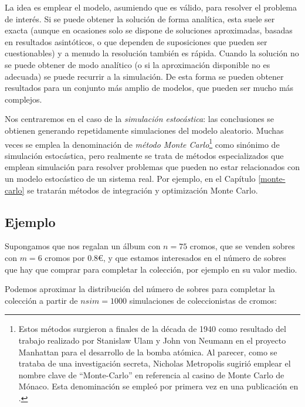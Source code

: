 \documentclass[
  spanish,
  10pt,
]{book}
\theoremstyle{break}
\theoremstyle{nonumberplain}
\let\oldfootnote\footnote
\renewcommand\footnote[1]{\oldfootnote{\hspace{2mm}#1}}
\begin{document}
La idea es emplear el modelo, asumiendo que es válido, para resolver el problema de interés.
Si se puede obtener la solución de forma analítica, esta suele ser exacta (aunque en ocasiones solo se dispone de soluciones aproximadas, basadas en resultados asintóticos, o que dependen de suposiciones que pueden ser cuestionables) y a menudo la resolución también es rápida.
Cuando la solución no se puede obtener de modo analítico (o si la aproximación disponible no es adecuada) se puede recurrir a la simulación.
De esta forma se pueden obtener resultados para un conjunto más amplio de modelos, que pueden ser mucho más complejos.

Nos centraremos en el caso de la \emph{simulación estocástica}: las conclusiones se obtienen generando repetidamente simulaciones del modelo aleatorio.
Muchas veces se emplea la denominación de \emph{método Monte Carlo}\footnote{Estos métodos surgieron a finales de la década de 1940 como resultado del trabajo realizado por Stanislaw Ulam y John von Neumann en el proyecto Manhattan para el desarrollo de la bomba atómica. Al parecer, como se trataba de una investigación secreta, Nicholas Metropolis sugirió emplear el nombre clave de ``Monte-Carlo'' en referencia al casino de Monte Carlo de Mónaco.
  Esta denominación se empleó por primera vez en una publicación en \citet{metropolis1949}.} como sinónimo de simulación estocástica, pero realmente se trata de métodos especializados que emplean simulación para resolver problemas que pueden no estar relacionados con un modelo estocástico de un sistema real. Por ejemplo, en el Capítulo \ref{monte-carlo} se tratarán métodos de integración y optimización Monte Carlo.

\subsection{Ejemplo}\label{ealbum}

Supongamos que nos regalan un álbum con \(n = 75\) cromos, que se venden sobres con \(m = 6\) cromos por 0.8€, y que estamos interesados en el número de sobres que hay que comprar para completar la colección, por ejemplo en su valor medio.

Podemos aproximar la distribución del número de sobres para completar la colección a partir de \(nsim=1000\) simulaciones de coleccionistas de cromos:
\end{document}
